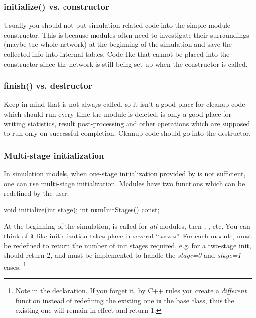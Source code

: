 \subsubsection{initialize() vs. constructor}


Usually you should not put simulation-related code into the
simple module constructor. This is because
modules often need to investigate their surroundings (maybe
the whole network) at the beginning of the simulation and save the
collected info into internal tables.  Code like that cannot be placed
into the constructor since the network is still being set up when the
constructor is called.


\subsubsection{finish() vs. destructor}


Keep in mind that  is not always called, so it isn't a
good place for cleanup code which should run every time the module is
deleted.  is only a good place for writing statistics,
result post-processing and other operations  which are supposed to run only on
successful completion. Cleanup code should go into the
destructor.


\subsubsection{Multi-stage initialization}


In simulation models, when one-stage
initialization provided by 
is not sufficient, one can use multi-stage
initialization.  Modules have two
functions which can be redefined by the user:

\begin{cpp}
void initialize(int stage);
int numInitStages() const;
\end{cpp}

At the beginning of the simulation, 
is called for \textit{all} modules, then ,
, etc. You can think of it like
initialization takes place in several ``waves''. For each module,
 must be redefined to return the number of init
stages required, e.g. for a two-stage init, 
should return 2, and  must be implemented to
handle the \textit{stage=0} and \textit{stage=1} cases.
  \footnote{Note  in the  declaration.
  If you forget it, by C++ rules you create a \textit{different} function
  instead of redefining the existing one in the base class, thus the
  existing one will remain in effect and return 1.}

